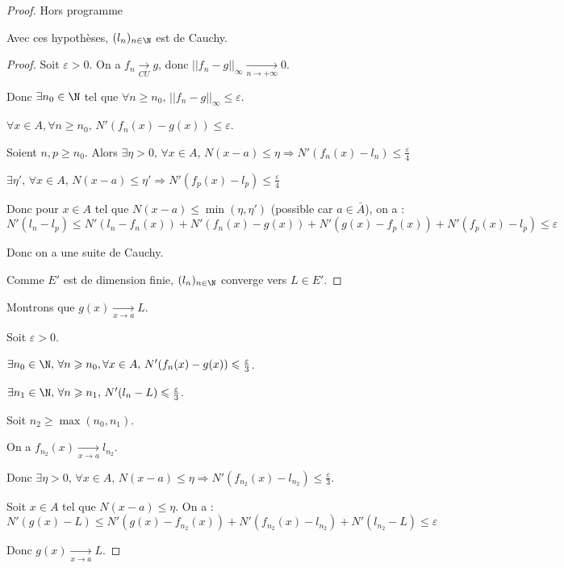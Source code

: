 \begin{proof}
    Hors programme 

     Avec ces hypothèses, $(l_n)_{n \in \N}$ est de Cauchy.

    \begin{proof}
        Soit $\varepsilon > 0$. On a $f_n \xrightarrow[CU]{} g$, donc $||f_n - g||_{\infty} \xrightarrow[n\to +\infty]{} 0$.

        Donc $\exists n_0 \in \N$ tel que $\forall n \geqslant n_0, \, || f_n - g ||_{\infty} \leqslant \varepsilon$.

        $\forall x \in A, \forall n \geqslant n_0, \, N'(f_n(x) - g(x)) \leqslant \varepsilon$.

        Soient $n, p \geqslant n_0$. Alors $\exists \eta > 0, \, \forall x \in A, \, N(x - a) \leqslant \eta \Rightarrow N'(f_n(x) - l_n) \leqslant \frac \varepsilon 4$

        $\exists \eta ', \, \forall x \in A, \, N(x - a) \leqslant \eta ' \Rightarrow N'(f_p(x) - l_p) \leqslant \frac \varepsilon 4$
    
        Donc pour $x \in A$ tel que $N(x - a) \leqslant \min(\eta, \eta ')$ (possible car $a \in \bar A$), on a :
        $$ N'(l_n - l_p) \leqslant N'(l_n - f_n(x)) + N'(f_n(x) - g(x)) + N'(g(x) - f_p(x)) + N'(f_p(x) - l_p) \leqslant \varepsilon$$

        Donc on a une suite de Cauchy. 

        Comme $E'$ est de dimension finie, $(l_n)_{n \in \N}$ converge vers $L \in E'$.

        
    \end{proof}

    Montrons que $g(x) \xrightarrow[x \to a]{} L$.

        Soit $\varepsilon > 0$. 

        $\exists n_0 \in \N, \, \forall n \geqslant n_0, \forall x \in A, \, N'(f_n(x) - g(x)) \leqslant \frac \varepsilon 3$. 

        $\exists n_1 \in \N, \, \forall n \geqslant n_1, \, N'(l_n - L) \leqslant \frac \varepsilon 3$.

        Soit $n_2 \geqslant \max(n_0, n_1)$. 

        On a $f_{n_2}(x) \xrightarrow[x \to a]{} l_{n_2}$.

        Donc $\exists \eta > 0, \, \forall x \in A, \, N(x - a) \leqslant \eta \Rightarrow N'(f_{n_2}(x) - l_{n_2}) \leqslant \frac \varepsilon 3$.

        Soit $x \in A$ tel que $N(x - a) \leqslant \eta$. On a : 
        $$N'(g(x) - L) \leqslant N'(g(x) - f_{n_2}(x)) + N'(f_{n_2}(x) - l_{n_2}) + N'(l_{n_2} - L) \leqslant \varepsilon$$

        Donc $g(x) \xrightarrow[x \to a]{} L$.
\end{proof}


